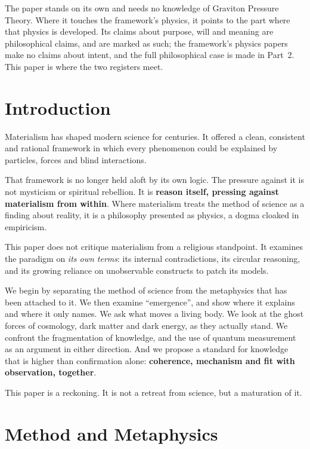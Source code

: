 \documentclass[11pt,a4paper]{article}
\begin{document}
The paper stands on its own and needs no knowledge of Graviton Pressure Theory. Where it touches the framework's physics, it points to the part where that physics is developed. Its claims about purpose, will and meaning are philosophical claims, and are marked as such; the framework's physics papers make no claims about intent, and the full philosophical case is made in Part~2. This paper is where the two registers meet.

\statuskey

\section*{Introduction}

Materialism has shaped modern science for centuries. It offered a clean, consistent and rational framework in which every phenomenon could be explained by particles, forces and blind interactions.

That framework is no longer held aloft by its own logic. The pressure against it is not mysticism or spiritual rebellion. It is \textbf{reason itself, pressing against materialism from within}. Where materialism treats the method of science as a finding about reality, it is a philosophy presented as physics, a dogma cloaked in empiricism.

This paper does not critique materialism from a religious standpoint. It examines the paradigm on \textit{its own terms}: its internal contradictions, its circular reasoning, and its growing reliance on unobservable constructs to patch its models.

We begin by separating the method of science from the metaphysics that has been attached to it. We then examine ``emergence'', and show where it explains and where it only names. We ask what moves a living body. We look at the ghost forces of cosmology, dark matter and dark energy, as they actually stand. We confront the fragmentation of knowledge, and the use of quantum measurement as an argument in either direction. And we propose a standard for knowledge that is higher than confirmation alone: \textbf{coherence, mechanism and fit with observation, together}.

This paper is a reckoning. It is not a retreat from science, but a maturation of it.

\section{Method and Metaphysics}
\label{sec:method}
\end{document}
